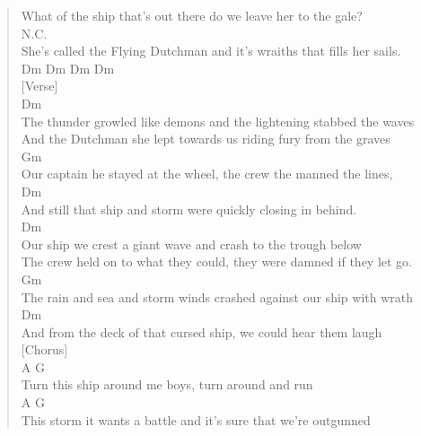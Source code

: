 \documentclass[11pt]{article}
\begin{document}
\begin{verse}
What of the ship that's out there do we leave her to the gale?\\
\vspace*{1em}
N.C.\\
She's called the Flying Dutchman and it's wraiths that fills her sails.\\
\vspace*{1em}
Dm Dm Dm Dm\\
\vspace*{1em}
[Verse]\\
Dm\\
The thunder growled like demons and the lightening stabbed the waves\\
\vspace*{1em}
And the Dutchman she lept towards us riding fury from the graves\\
\vspace*{1em}
Gm\\
Our captain he stayed at the wheel, the crew the manned the lines,\\
\vspace*{1em}
Dm\\
And still that ship and storm were quickly closing in behind.\\
\vspace*{1em}
\vspace*{1em}
\vspace*{1em}
Dm\\
Our ship we crest a giant wave and crash to the trough below\\
\vspace*{1em}
The crew held on to what they could, they were damned if they let go.\\
\vspace*{1em}
Gm\\
The rain and sea and storm winds crashed against our ship with wrath\\
\vspace*{1em}
Dm\\
And from the deck of that cursed ship, we could hear them laugh\\
\vspace*{1em}
[Chorus]\\
A                              G\\
Turn this ship around me boys, turn around and run\\
\vspace*{1em}
A                                     G\\
This storm it wants a battle and it's sure that we're outgunned\\

\end{verse}
\end{document}
